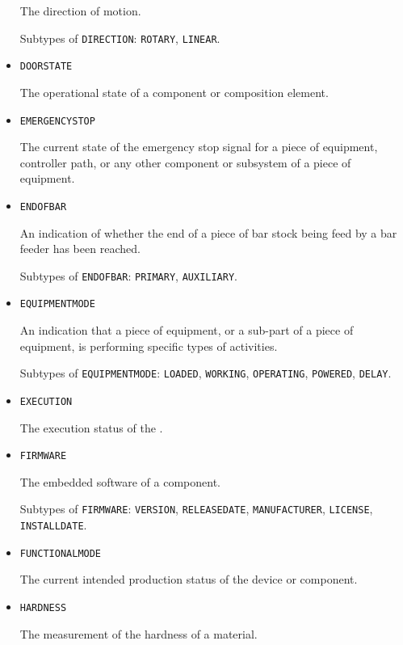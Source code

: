 \begin{itemize}
The direction of motion.

Subtypes of \texttt{DIRECTION}: \texttt{ROTARY}, \texttt{LINEAR}.

\item \texttt{DOOR\textunderscore STATE}  

The operational state of a  component or composition element.


\item \texttt{EMERGENCY\textunderscore STOP}  

The current state of the emergency stop signal for a piece of equipment, controller path, or any other component or subsystem of a piece of equipment.


\item \texttt{END\textunderscore OF\textunderscore BAR}  

An indication of whether the end of a piece of bar stock being feed by a bar feeder has been reached.

Subtypes of \texttt{END\textunderscore OF\textunderscore BAR}: \texttt{PRIMARY}, \texttt{AUXILIARY}.

\item \texttt{EQUIPMENT\textunderscore MODE}  

An indication that a piece of equipment, or a sub-part of a piece of equipment, is performing specific types of activities.

Subtypes of \texttt{EQUIPMENT\textunderscore MODE}: \texttt{LOADED}, \texttt{WORKING}, \texttt{OPERATING}, \texttt{POWERED}, \texttt{DELAY}.

\item \texttt{EXECUTION}  

The execution status of the .


\item \texttt{FIRMWARE}  

The embedded software of a component.


Subtypes of \texttt{FIRMWARE}: \texttt{VERSION}, \texttt{RELEASE\textunderscore DATE}, \texttt{MANUFACTURER}, \texttt{LICENSE}, \texttt{INSTALL\textunderscore DATE}.

\item \texttt{FUNCTIONAL\textunderscore MODE}  

The current intended production status of the device or component.


\item \texttt{HARDNESS}  

The measurement of the hardness of a material.


\end{itemize}
